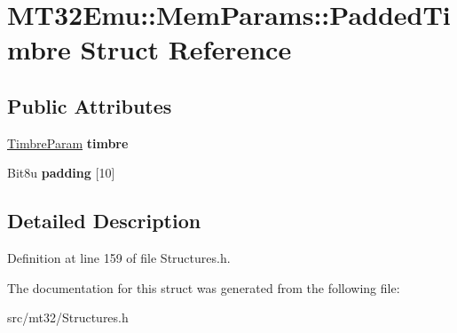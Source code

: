 \hypertarget{structMT32Emu_1_1MemParams_1_1PaddedTimbre}{\section{M\-T32\-Emu\-:\-:Mem\-Params\-:\-:Padded\-Timbre Struct Reference}
\label{structMT32Emu_1_1MemParams_1_1PaddedTimbre}
}
\subsection*{Public Attributes}
\begin{DoxyCompactItemize}
\item 
\hypertarget{structMT32Emu_1_1MemParams_1_1PaddedTimbre_a87390a11addc8d89eef23326ad049d96}{\hyperlink{structMT32Emu_1_1TimbreParam}{Timbre\-Param} {\bfseries timbre}}\label{structMT32Emu_1_1MemParams_1_1PaddedTimbre_a87390a11addc8d89eef23326ad049d96}

\item 
\hypertarget{structMT32Emu_1_1MemParams_1_1PaddedTimbre_aca8b264ad49593ee03c329b58b4bd830}{Bit8u {\bfseries padding} \mbox{[}10\mbox{]}}\label{structMT32Emu_1_1MemParams_1_1PaddedTimbre_aca8b264ad49593ee03c329b58b4bd830}

\end{DoxyCompactItemize}


\subsection{Detailed Description}


Definition at line 159 of file Structures.\-h.



The documentation for this struct was generated from the following file\-:\begin{DoxyCompactItemize}
\item 
src/mt32/Structures.\-h\end{DoxyCompactItemize}
